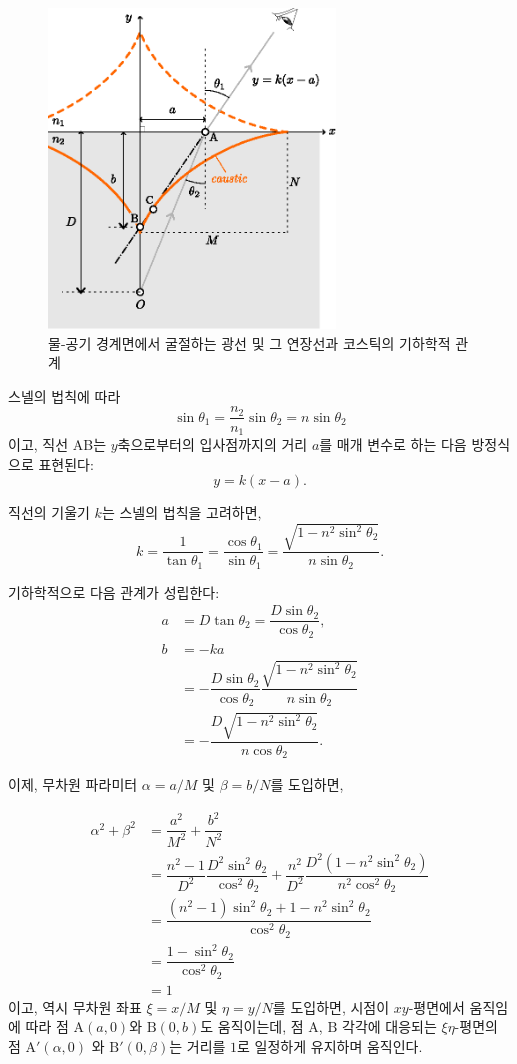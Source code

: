 \documentclass[twocolumn]{article}
\begin{document}
\begin{figure}
	\centering
	\includegraphics[width=3in]{figs/g237.eps}
	\caption{물-공기 경계면에서 굴절하는 광선 및 그 연장선과 코스틱의 기하학적 관계}
	\label{fig:geometry}
\end{figure}

스넬의 법칙에 따라
$$ \sin\theta_1 = \frac{n_2}{n_1} \sin\theta_2 = n\sin\theta_2$$
이고,  직선 AB는 $y$축으로부터의 입사점까지의 거리 $a$를 매개 변수로 하는 다음 방정식으로 표현된다:
$$y=k(x-a).$$

직선의 기울기 $k$는 스넬의 법칙을 고려하면,
$$k=\dfrac{1}{\tan\theta_1}=\dfrac{\cos\theta_1}{\sin\theta_1}
	=\dfrac{\sqrt{1-n^2\sin^2\theta_2}}{n\sin\theta_2}.$$
	
기하학적으로 다음 관계가 성립한다:
$$\begin{aligned}
	a &= D\tan\theta_2 = \dfrac{D\sin\theta_2}{\cos\theta_2},\\
	b &= -ka \\
	&= -\dfrac{D\sin\theta_2}{\cos\theta_2}
	\dfrac{\sqrt{1-n^2\sin^2\theta_2}}{n\sin\theta_2}\\
	&=-\dfrac{D\sqrt{1-n^2\sin^2\theta_2}}{n\cos\theta_2}.
\end{aligned}$$

이제, 무차원 파라미터 $\alpha=a/M$ 및 $\beta=b/N$를 도입하면,

$$ \begin{aligned}
	\alpha^2 + \beta^2 &= \dfrac{a^2}{M^2}+\dfrac{b^2}{N^2}\\
	&=\dfrac{n^2-1}{D^2}\dfrac{D^2\sin^2\theta_2}{\cos^2\theta_2}%
	+\dfrac{n^2}{D^2}\dfrac{D^2(1-n^2\sin^2\theta_2)}{n^2\cos^2\theta_2}\\
	&=\dfrac{\left(n^2-1\right)\sin^2\theta_2 + 1-n^2\sin^2\theta_2}
	{\cos^2\theta_2}\\
	&=\dfrac{1-\sin^2\theta_2}{\cos^2\theta_2}\\
	&= 1
\end{aligned}$$
%
이고, 역시 무차원 좌표 $\xi=x/M$ 및 $\eta=y/N$를 도입하면, 시점이 $xy$-평면에서 움직임에 따라 점 $\mathrm{A}(a, 0)$와 $\mathrm{B}(0, b)$도 움직이는데, 점 $\mathrm{A}$, $\mathrm{B}$ 각각에 대응되는  $\xi\eta$-평면의 점 $\mathrm{A'}(\alpha, 0)$
와 $\mathrm{B'}(0, \beta)$는 거리를 $1$로 일정하게 유지하며 움직인다.
\end{document}

